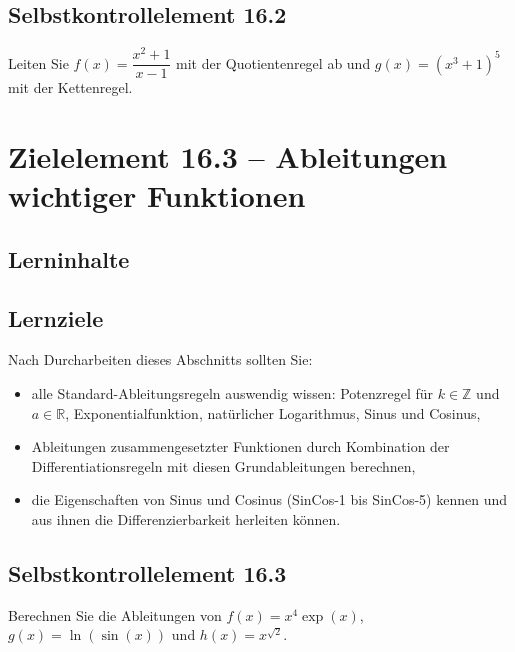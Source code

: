 \documentclass[a4paper,12pt]{article}
\begin{document}
\subsection*{Selbstkontrollelement 16.2}

Leiten Sie $f(x) = \dfrac{x^2 + 1}{x - 1}$ mit der Quotientenregel ab und
$g(x) = (x^3 + 1)^5$ mit der Kettenregel.

\newpage

\section*{Zielelement 16.3 -- Ableitungen wichtiger Funktionen}

\subsection*{Lerninhalte}

\begin{center}
\end{center}

\subsection*{Lernziele}

Nach Durcharbeiten dieses Abschnitts sollten Sie:
\begin{itemize}
  \item alle Standard-Ableitungsregeln auswendig wissen: Potenzregel für
        $k \in \mathbb{Z}$ und $a \in \mathbb{R}$, Exponentialfunktion,
        natürlicher Logarithmus, Sinus und Cosinus,
  \item Ableitungen zusammengesetzter Funktionen durch Kombination der
        Differentiationsregeln mit diesen Grundableitungen berechnen,
  \item die Eigenschaften von Sinus und Cosinus (SinCos-1 bis SinCos-5)
        kennen und aus ihnen die Differenzierbarkeit herleiten können.
\end{itemize}

\subsection*{Selbstkontrollelement 16.3}

Berechnen Sie die Ableitungen von
$f(x) = x^4 \exp(x)$,\quad $g(x) = \ln(\sin(x))$ und \quad $h(x) = x^{\sqrt{2}}$.
\end{document}
